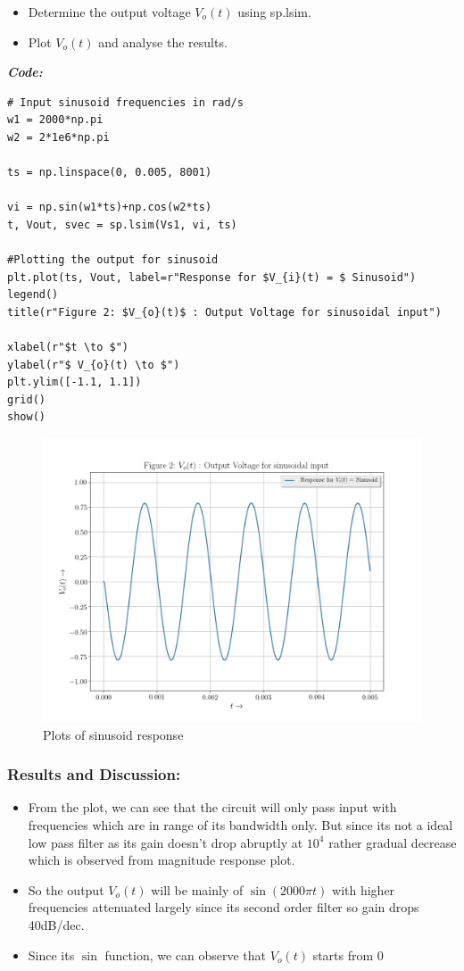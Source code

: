 \documentclass[11pt, a4paper]{article}
\begin{document}
  \begin{itemize}
  \item
    Determine the output voltage \(V_{o}(t)\) using sp.lsim.
  \item
    Plot  \(V_{o}(t)\) and analyse the results.
  \end{itemize}
    \textit{\textbf{Code:}}
   \begin{lstlisting}
# Input sinusoid frequencies in rad/s
w1 = 2000*np.pi
w2 = 2*1e6*np.pi

ts = np.linspace(0, 0.005, 8001)

vi = np.sin(w1*ts)+np.cos(w2*ts)
t, Vout, svec = sp.lsim(Vs1, vi, ts)

#Plotting the output for sinusoid
plt.plot(ts, Vout, label=r"Response for $V_{i}(t) = $ Sinusoid")
legend()
title(r"Figure 2: $V_{o}(t)$ : Output Voltage for sinusoidal input")

xlabel(r"$t \to $")
ylabel(r"$ V_{o}(t) \to $")
plt.ylim([-1.1, 1.1])
grid()
show()
   \end{lstlisting}
   \newpage
   \begin{figure}[!tbh]
    \centering
    \includegraphics[scale=0.5]{./../Extras/A72.png}  %
   \caption{Plots of sinusoid response}
  \end{figure}
  \newpage
  \subsubsection{Results and Discussion:}\label{results-and-discussion}
\begin{itemize}
  \item
  From the plot, we can see that the circuit will only pass input with frequencies which are in
  range of its bandwidth only. But since its not a ideal low pass filter as
  its gain doesn't drop abruptly at \(10^4\) rather gradual decrease
  which is observed from magnitude response plot.
\item
  So the output \(V_o(t)\) will be mainly of \(\sin(2000\pi t)\) with
  higher frequencies attenuated largely since its second order filter so
  gain drops 40dB/dec.
\item
  Since its \(\sin\) function, we can observe that \(V_{o}(t)\) starts
  from 0
\end{itemize}
\newpage
\end{document}
